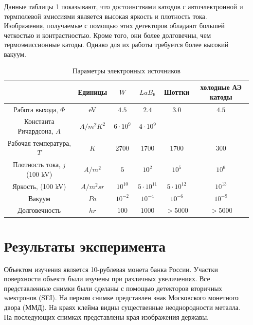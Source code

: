 \documentclass[12pt]{article}
\begin{document}
Данные таблицы 1 показывают, что достоинствами катодов с автоэлектронной и термполевой эмиссиями является высокая яркость и плотность тока. Изображения, получаемые с помощью этих детекторов обладают большей четкостью и контрастностью. Кроме того, они более долговечны, чем термоэмиссионные катоды. Однако для их работы требуется более высокий вакуум.

\begin{table}[!ht]
\centering
\label{table1}
\begin{tabular}{cccccc}
& Единицы & $W$ & $LaB_6$ & Шоттки & холодные АЭ катоды \\
\hline
Работа выхода, $\Phi$ & eV & $4.5$ & $2.4$ & $3.0$ & $4.5$ \\
Константа Ричардсона, $A$ & $A / m^2 K^2$ & $6 \cdot 10^{9}$ & $4 \cdot 10^{9}$ & & \\
Рабочая температура, $T$ & $K$ & 2700 & 1700 & 1700 & 300 \\
Плотность тока, $j$ (100 kV) & $A / m^2$ & $5$ & $10^{2}$ & $10^{5}$ & $10^{6}$ \\
Яркость, (100 kV) & $A/m^2 sr$ & $10^{10}$ & $5 \cdot 10^{11}$ & $5 \cdot 10^{12}$ & $10^{13}$ \\
Вакуум & $Pa$ & $10^{-2}$ & $10^{-4}$ & $10^{-6}$ & $10^{-9}$ \\
Долговечность & $hr$ & $100$ & $1000$ & $>5000$ & $>5000$ \\
\hline
\end{tabular}
\caption{Параметры электронных источников}
\end{table}

\clearpage
\section*{Результаты эксперимента}

Объектом изучения является 10-рублевая монета банка России. Участки поверхности объекта были изучены при различных увеличениях. Все представленные снимки были сделаны с помощью детекторов вторичных электронов (SEI). На первом снимке представлен знак Московского монетного двора (ММД). На краях клейма видны существенные неоднородности металла. На последующих снимках представлены края изображения державы. 
\end{document}
